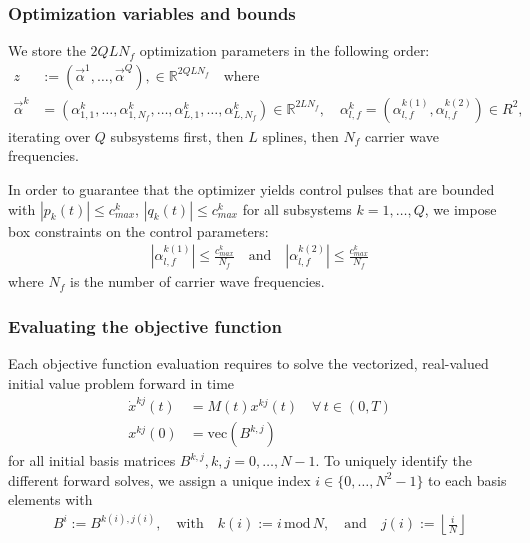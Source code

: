 \documentclass[letterpaper]{article}
\newcommand{\R}{\mathds{R}}
\begin{document}
  \subsubsection{Optimization variables and bounds}
  We store the $2QLN_f$ optimization parameters in the following order:
  \begin{align}
    z &:= \left( \vec{\alpha}^1, \dots, \vec{\alpha}^Q \right), \in \mathds{R}^{2QLN_f} \quad \text{where}\\
    \vec{\alpha}^k &= \left( \alpha_{1,1}^k,\dots, \alpha_{1,N_f}^k, \dots, \alpha_{L,1}^{k}, \dots, \alpha_{L,N_f}^k \right) \in \R^{2LN_f}, \quad \alpha_{l,f}^k = \left(\alpha_{l,f}^{k(1)}, \alpha_{l,f}^{k(2)} \right) \in R^2,
  \end{align}
  iterating over $Q$ subsystems first, then $L$ splines, then $N_f$ carrier wave frequencies. 

  In order to guarantee that the optimizer yields control pulses that are bounded with $|p_k(t)| \leq c^k_{max}$, $|q_k(t)| \leq c^k_{max}$ for all subsystems $k=1,\dots, Q$, we impose box constraints on the control parameters:
   \begin{align}
     | \alpha_{l,f}^{k(1)}| \leq \frac{c^k_{max}}{N_f} \quad \text{and} \quad | \alpha_{l,f}^{k(2)} | \leq \frac{c^k_{max}}{N_f}
   \end{align}
   where $N_f$ is the number of carrier wave frequencies.



  \subsubsection{Evaluating the objective function}
    Each objective function evaluation requires to solve the vectorized, real-valued initial value problem forward in time
    \begin{align*}
      \dot x^{kj}(t) &= M(t) x^{kj}(t) \quad \forall \, t\in (0,T) \\
      x^{kj}(0) &= \mbox{vec}(B^{k,j})
    \end{align*}
    for all initial basis matrices $B^{k,j}, k,j=0,\dots,N-1$. To uniquely identify the different forward solves, we assign a unique index $i \in \{0,\dots, N^2-1\}$ to each basis elements with 
    \begin{align*}
      B^i := B^{k(i), j(i)}, \quad \text{with} \quad k(i) := i \,\mbox{mod}\, N, \quad \text{and} \quad j(i) := \left\lfloor \frac{i}{N} \right\rfloor
    \end{align*}
\end{document}
